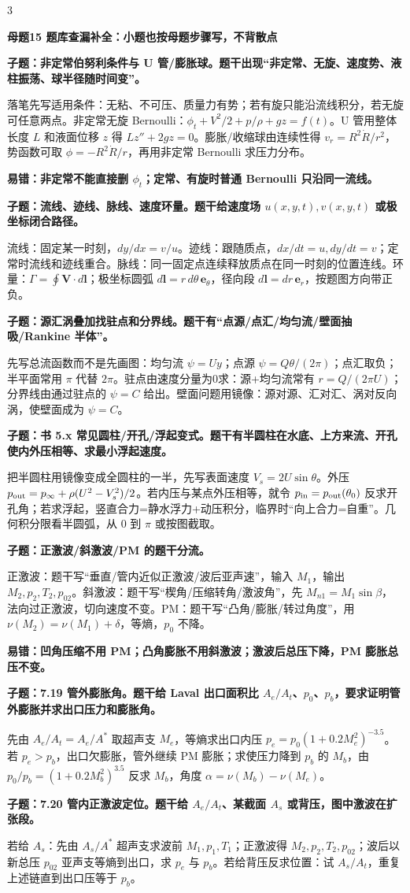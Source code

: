 \documentclass[a4paper]{article}
\newcommand{\mt}[1]{\vspace{0.45pt}\colorbox{M}{\parbox{\dimexpr\linewidth-2\fboxsep}{\color{white}\bfseries #1}}\par}
\newcommand{\qt}[1]{\vspace{0.25pt}\colorbox{Q}{\parbox{\dimexpr\linewidth-2\fboxsep}{\color{white}\bfseries #1}}\par}
\newcommand{\ans}[1]{\colorbox{G}{\parbox{\dimexpr\linewidth-2\fboxsep}{#1}}\par}
\newcommand{\warn}[1]{\colorbox{Y}{\parbox{\dimexpr\linewidth-2\fboxsep}{\color{E}\bfseries #1}}\par}
\begin{document}
\begin{multicols}{3}
\mt{母题15 题库查漏补全：小题也按母题步骤写，不背散点}
\qt{子题：非定常伯努利条件与 U 管/膨胀球。题干出现“非定常、无旋、速度势、液柱振荡、球半径随时间变”。}
\ans{落笔先写适用条件：无粘、不可压、质量力有势；若有旋只能沿流线积分，若无旋可任意两点。非定常无旋 Bernoulli：$\phi_t+V^2/2+p/\rho+gz=f(t)$。U 管用整体长度 $L$ 和液面位移 $z$ 得 $Lz''+2gz=0$。膨胀/收缩球由连续性得 $v_r=R^2\dot R/r^2$，势函数可取 $\phi=-R^2\dot R/r$，再用非定常 Bernoulli 求压力分布。}
\warn{易错：非定常不能直接删 $\phi_t$；定常、有旋时普通 Bernoulli 只沿同一流线。}
\qt{子题：流线、迹线、脉线、速度环量。题干给速度场 $u(x,y,t),v(x,y,t)$ 或极坐标闭合路径。}
\ans{流线：固定某一时刻，$dy/dx=v/u$。迹线：跟随质点，$dx/dt=u,dy/dt=v$；定常时流线和迹线重合。脉线：同一固定点连续释放质点在同一时刻的位置连线。环量：$\Gamma=\oint\bm V\cdot d\bm l$；极坐标圆弧 $d\bm l=r\,d\theta\,\bm e_\theta$，径向段 $d\bm l=dr\,\bm e_r$，按题图方向带正负。}
\qt{子题：源汇涡叠加找驻点和分界线。题干有“点源/点汇/均匀流/壁面抽吸/Rankine 半体”。}
\ans{先写总流函数而不是先画图：均匀流 $\psi=Uy$；点源 $\psi=Q\theta/(2\pi)$；点汇取负；半平面常用 $\pi$ 代替 $2\pi$。驻点由速度分量为0求：源+均匀流常有 $r=Q/(2\pi U)$；分界线由通过驻点的 $\psi=C$ 给出。壁面问题用镜像：源对源、汇对汇、涡对反向涡，使壁面成为 $\psi=C$。}
\qt{子题：书 5.x 常见圆柱/开孔/浮起变式。题干有半圆柱在水底、上方来流、开孔使内外压相等、求最小浮起速度。}
\ans{把半圆柱用镜像变成全圆柱的一半，先写表面速度 $V_s=2U\sin\theta$。外压 $p_{\rm out}=p_\infty+\rho(U^2-V_s^2)/2$。若内压与某点外压相等，就令 $p_{\rm in}=p_{\rm out}(\theta_0)$ 反求开孔角；若求浮起，竖直合力=静水浮力+动压积分，临界时“向上合力=自重”。几何积分限看半圆弧，从 $0$ 到 $\pi$ 或按图截取。}
\qt{子题：正激波/斜激波/PM 的题干分流。}
\ans{正激波：题干写“垂直/管内近似正激波/波后亚声速”，输入 $M_1$，输出 $M_2,p_2,T_2,p_{02}$。斜激波：题干写“楔角/压缩转角/激波角”，先 $M_{n1}=M_1\sin\beta$，法向过正激波，切向速度不变。PM：题干写“凸角/膨胀/转过角度”，用 $\nu(M_2)=\nu(M_1)+\delta$，等熵，$p_0$ 不降。}
\warn{易错：凹角压缩不用 PM；凸角膨胀不用斜激波；激波后总压下降，PM 膨胀总压不变。}
\qt{子题：7.19 管外膨胀角。题干给 Laval 出口面积比 $A_e/A_t$、$p_0$、$p_b$，要求证明管外膨胀并求出口压力和膨胀角。}
\ans{先由 $A_e/A_t=A_e/A^*$ 取超声支 $M_e$，等熵求出口内压 $p_e=p_0(1+0.2M_e^2)^{-3.5}$。若 $p_e>p_b$，出口欠膨胀，管外继续 PM 膨胀；求使压力降到 $p_b$ 的 $M_b$，由 $p_0/p_b=(1+0.2M_b^2)^{3.5}$ 反求 $M_b$，角度 $\alpha=\nu(M_b)-\nu(M_e)$。}
\qt{子题：7.20 管内正激波定位。题干给 $A_e/A_t$、某截面 $A_s$ 或背压，图中激波在扩张段。}
\ans{若给 $A_s$：先由 $A_s/A^*$ 超声支求波前 $M_1,p_1,T_1$；正激波得 $M_2,p_2,T_2,p_{02}$；波后以新总压 $p_{02}$ 亚声支等熵到出口，求 $p_e$ 与 $p_b$。若给背压反求位置：试 $A_s/A_t$，重复上述链直到出口压等于 $p_b$。}

\end{multicols}
\end{document}
